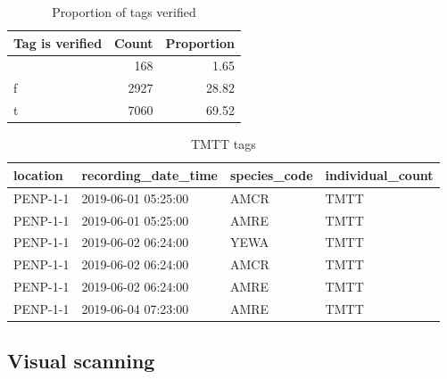 \documentclass[
  letterpaper,
  DIV=11,
  numbers=noendperiod,
  oneside]{scrartcl}
\begin{document}
\hypertarget{tbl-verified}{}
\begin{table}
\caption{\label{tbl-verified}Proportion of tags verified }\tabularnewline

\centering
\begin{tabular}{l|r|r}
\hline
Tag is verified & Count & Proportion\\
\hline
 & 168 & 1.65\\
\hline
f & 2927 & 28.82\\
\hline
t & 7060 & 69.52\\
\hline
\end{tabular}
\end{table}

\hypertarget{tbl-tmtt}{}
\begin{table}
\caption{\label{tbl-tmtt}TMTT tags }\tabularnewline

\centering
\begin{tabular}{l|l|l|l}
\hline
location & recording\_date\_time & species\_code & individual\_count\\
\hline
PENP-1-1 & 2019-06-01 05:25:00 & AMCR & TMTT\\
\hline
PENP-1-1 & 2019-06-01 05:25:00 & AMRE & TMTT\\
\hline
PENP-1-1 & 2019-06-02 06:24:00 & YEWA & TMTT\\
\hline
PENP-1-1 & 2019-06-02 06:24:00 & AMCR & TMTT\\
\hline
PENP-1-1 & 2019-06-02 06:24:00 & AMRE & TMTT\\
\hline
PENP-1-1 & 2019-06-04 07:23:00 & AMRE & TMTT\\
\hline
\end{tabular}
\end{table}

\hypertarget{visual-scanning}{%
\subsection{Visual scanning}\label{visual-scanning}}
\end{document}
